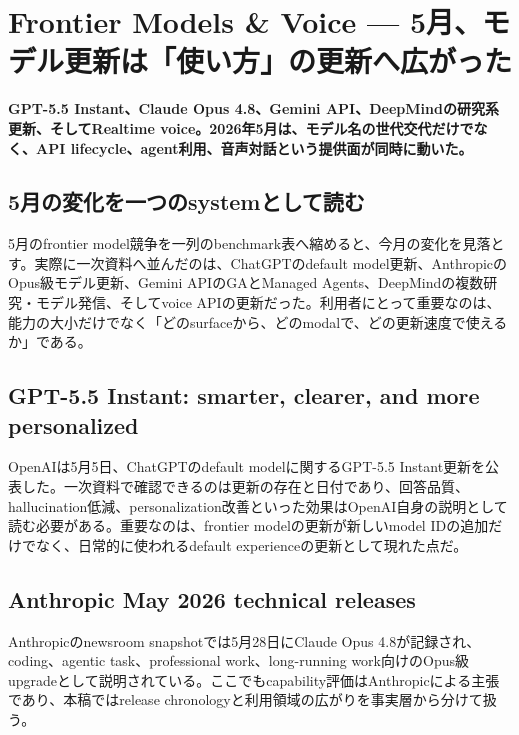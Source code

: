 \section{Frontier Models \& Voice — 5月、モデル更新は「使い方」の更新へ広がった}
\label{pkg:frontier-models-may}
\noindent\textbf{GPT-5.5 Instant、Claude Opus 4.8、Gemini API、DeepMindの研究系更新、そしてRealtime voice。2026年5月は、モデル名の世代交代だけでなく、API lifecycle、agent利用、音声対話という提供面が同時に動いた。}\autocite{src-01a8b52eee81,src-24a3c172de48,src-5c3d93bd7160,src-a24fd97eb3d0,src-dd5d9b8662f3,src-eac8dfbeb78c,src-f6aa679babd7}

\subsection{5月の変化を一つのsystemとして読む}

5月のfrontier model競争を一列のbenchmark表へ縮めると、今月の変化を見落とす。実際に一次資料へ並んだのは、ChatGPTのdefault model更新、AnthropicのOpus級モデル更新、Gemini APIのGAとManaged Agents、DeepMindの複数研究・モデル発信、そしてvoice APIの更新だった。利用者にとって重要なのは、能力の大小だけでなく「どのsurfaceから、どのmodalで、どの更新速度で使えるか」である。\autocite{src-01a8b52eee81,src-24a3c172de48,src-5c3d93bd7160,src-a24fd97eb3d0,src-dd5d9b8662f3,src-eac8dfbeb78c,src-f6aa679babd7}


\subsection{GPT-5.5 Instant: smarter, clearer, and more personalized}

OpenAIは5月5日、ChatGPTのdefault modelに関するGPT-5.5 Instant更新を公表した。一次資料で確認できるのは更新の存在と日付であり、回答品質、hallucination低減、personalization改善といった効果はOpenAI自身の説明として読む必要がある。重要なのは、frontier modelの更新が新しいmodel IDの追加だけでなく、日常的に使われるdefault experienceの更新として現れた点だ。\autocite{src-01a8b52eee81}


\subsection{Anthropic May 2026 technical releases}

Anthropicのnewsroom snapshotでは5月28日にClaude Opus 4.8が記録され、coding、agentic task、professional work、long-running work向けのOpus級upgradeとして説明されている。ここでもcapability評価はAnthropicによる主張であり、本稿ではrelease chronologyと利用領域の広がりを事実層から分けて扱う。\autocite{src-f6aa679babd7}


